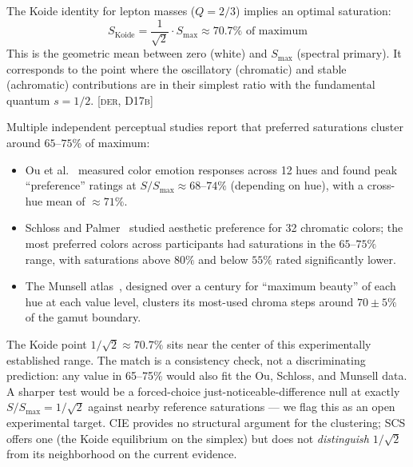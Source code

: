 \documentclass[12pt,a4paper]{article}
\begin{document}
\begin{derivedbox}
The Koide identity for lepton masses ($Q = 2/3$) implies an optimal
saturation:
\begin{equation}
  S_{\text{Koide}} = \frac{1}{\sqrt{2}} \cdot S_{\max}
    \approx 70.7\% \text{ of maximum}
  \label{eq:koide}
\end{equation}
This is the geometric mean between zero (white) and $S_{\max}$
(spectral primary). It corresponds to the point where the oscillatory
(chromatic) and stable (achromatic) contributions are in their simplest
ratio with the fundamental quantum $s = 1/2$. \textsc{[der, D17b]}
\end{derivedbox}

\begin{remark}
Multiple independent perceptual studies report that preferred
saturations cluster around $65$--$75\%$ of maximum:
\begin{itemize}[nosep]
\item Ou et al.~\cite{ou2004} measured color emotion responses
  across 12 hues and found peak ``preference'' ratings at
  $S/S_{\max} \approx 68$--$74\%$ (depending on hue), with a
  cross-hue mean of $\approx 71\%$.
\item Schloss and Palmer~\cite{schloss2010} studied aesthetic
  preference for 32 chromatic colors; the most preferred colors
  across participants had saturations in the $65$--$75\%$ range,
  with saturations above $80\%$ and below $55\%$ rated significantly
  lower.
\item The Munsell atlas~\cite{munsell1905}, designed over a century
  for ``maximum beauty'' of each hue at each value level, clusters
  its most-used chroma steps around $70\pm5\%$ of the gamut boundary.
\end{itemize}
The Koide point $1/\sqrt{2} \approx 70.7\%$ sits near the center of
this experimentally established range. The match is a consistency
check, not a discriminating prediction: any value in 65--75\% would
also fit the Ou, Schloss, and Munsell data. A sharper test would be a
forced-choice just-noticeable-difference null at exactly
$S/S_{\max} = 1/\sqrt{2}$ against nearby reference saturations ---
we flag this as an open experimental target. CIE provides no
structural argument for the clustering; SCS offers one (the Koide
equilibrium on the simplex) but does not \emph{distinguish} $1/\sqrt{2}$
from its neighborhood on the current evidence.
\end{remark}

\end{document}
